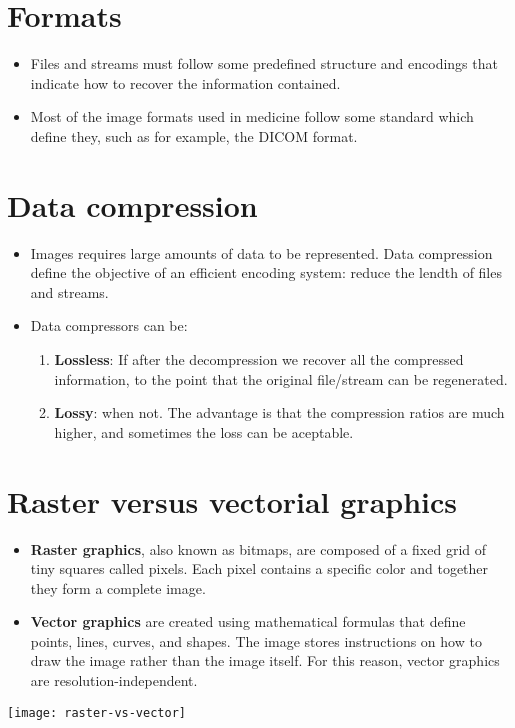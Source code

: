 \section{Formats}
\begin{itemize}
\item Files and streams must follow some predefined structure and
encodings that indicate how to recover the information contained.
\item Most of the image formats used in medicine follow some standard
which define they, such as for example, the DICOM format.
\end{itemize}

\section{Data compression}
\begin{itemize}
\item Images requires large amounts of data to be represented. Data
compression define the objective of an efficient encoding system:
reduce the lendth of files and streams.
\item Data compressors can be:
\begin{enumerate}
\item \textbf{Lossless}: If after the decompression we recover all the
compressed information, to the point that the original file/stream can
be regenerated.
\item \textbf{Lossy}: when not. The advantage is that the compression
ratios are much higher, and sometimes the loss can be aceptable.
\end{enumerate}
\end{itemize}

\section{Raster versus vectorial graphics}
\begin{itemize}
\item \textbf{Raster graphics}, also known as bitmaps, are composed of
  a fixed grid of tiny squares called pixels. Each pixel contains a
  specific color and together they form a complete image.
\item \textbf{Vector graphics} are created using mathematical formulas
  that define points, lines, curves, and shapes. The image stores
  instructions on how to draw the image rather than the image itself.
  For this reason, vector graphics are resolution-independent.
\end{itemize}
\begin{center}
  \texttt{[image: raster-vs-vector]}
\end{center}

